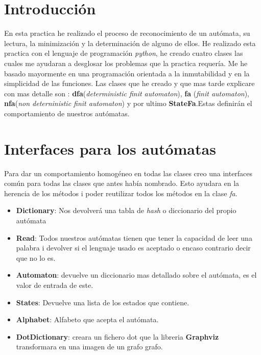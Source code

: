 \documentclass{article}
\begin{document}
    \section{Introducción}\label{sec:introducción}
    En esta practica he realizado el proceso de reconocimiento de un autómata, su lectura, la minimización y la determinación de alguno de ellos. He realizado esta practica con el lenguaje de programación \textit{python}, he creado cuatro clases las cuales me ayudaran a desglosar los problemas que la practica requería. Me he basado mayormente en una programación orientada a la inmutabilidad y en la simplicidad de las funciones. Las clases que he creado y que mas tarde explicare con mas detalle son : \textbf{dfa}(\textit{deterministic finit automaton}), \textbf{fa} (\textit{finit automaton}), \textbf{nfa}(\textit{non deterninistic finit automaton}) y por ultimo  \textbf{StateFa}.Estas definirán el comportamiento de nuestros autómatas.



    \section{Interfaces para los autómatas}\label{sec:interfaces-para-los-autómatas}
    Para dar un comportamiento homogéneo en todas las clases creo una interfaces común para todas las clases que antes había nombrado. Esto ayudara en la herencia de los métodos i poder reutilizar todos los métodos en la clase \textit{fa}.
    \begin{itemize}
        \item \textbf{Dictionary}: Nos devolverá una tabla de \textit{hash} o diccionario del propio autómata
        \item \textbf{Read}: Todos nuestros autómatas tienen que tener la capacidad de leer una palabra i devolver si el lenguaje usado es aceptado o encaso contrario decir que no lo es.
        \item \textbf{Automaton}: devuelve un diccionario mas detallado sobre el autómata, es el valor de entrada de este.
        \item \textbf{States}: Devuelve una lista de los estados que contiene.
        \item \textbf{Alphabet}: Alfabeto que acepta el autómata.
        \item \textbf{DotDictionary}: creara un fichero dot que la libreria \textbf{Graphviz} transformara en una imagen de un grafo grafo.
    \end{itemize}
\end{document}
